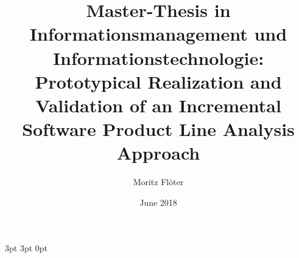 \documentclass[a4paper]{article}
\title{\large Master-Thesis in Informationsmanagement und Informationstechnologie: \\ \Huge Prototypical Realization and Validation of an Incremental Software Product Line Analysis Approach}
\author{Moritz Fl\"oter}
\date{June 2018}
\begin{document}


  {3pt}%
  {3pt}%
  {\normalfont}%
  {0pt}%
  {\bfseries}%
  {}%
  {\newline}%
  {}%

\theoremstyle{mystyle}


\newtheorem{req}{REQ}
\newtheorem{subreq}{REQ}[req]
\newtheorem{subsubreq}{REQ}[subreq]
\setcounter{req}{0}

\newcommand*{\reqtable}[4]{
\begin{tabular}{ | p{0.15\textwidth} | p{0.79\textwidth} | }
	\hline
	\textit{Priority} & \begin{minipage}[l]{0.79\textwidth}
	\vspace{0.25em}
		#1
	\vspace{0.25em}
	\end{minipage} \\ \hline
	\textit{Source} & \begin{minipage}[l]{0.79\textwidth}
	\vspace{0.25em}
		#2
	\vspace{0.25em}
	\end{minipage}\\ \hline
	\textit{Description} & \begin{minipage}[l]{0.79\textwidth}
	\vspace{0.25em}
		#3
	\vspace{0.25em}
	\end{minipage} \\ \hline
	\textit{Explanation} & \begin{minipage}[l]{0.79\textwidth} 
	\vspace{0.25em}
		#4
	\vspace{0.25em}
	\end{minipage} \\
	\hline
\end{tabular}
}



\maketitle
\newblock
\end{document}
